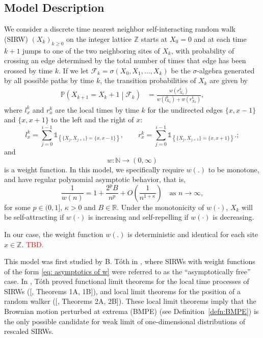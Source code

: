 \documentclass[twoside,12pt,a4paper]{article}
\numberwithin{equation}{section}
\newcommand\TBD{\textcolor{red}{TBD.}}
\begin{document}
	\subsection{Model Description} 
	We consider a discrete time nearest neighbor self-interacting random walk (SIRW) $(X_k)_{k\geq 0}$ on the integer lattice $\mathbb{Z}$ starts at $X_0 = 0$ and at each time $k+1$ jumps to one of the two neighboring sites of $X_k$, with probability of crossing an edge determined by the total number of times that edge has been crossed by time $k$. 
	If we let $\mathcal{F}_k = \sigma\left( X_0,X_1,\dots,X_k \right) $ be the $\sigma$-algebra generated by all possible paths by time $k$, the transition probabilities of $X_k$ are given by
	\begin{align}\label{dynamic}
		\mathbb{P}\left( X_{k+1} =  X_k+1 \middle| \mathcal{F}_k   \right) 
		&=  \frac{  w(r_{X_k}^k)}{ w(l_{X_k}^k)  + w(r_{X_k}^k)   }
	,\end{align}
	where $l_x^k$ and $r_x^k$ are the local times by time $k$ for the undirected edges $\{x,x-1\}$ and $\{x,x+1\}$ to the left and the right of $x$:
	\[ 
	l_x^k = \sum_{j=0}^{i-1} \mathbb{1}_{ \left\{  \{X_j, X_{j+1}\} =  \{x,x-1\} \right\} }, \qquad
	r_x^k = \sum_{j=0}^{i-1} \mathbb{1}_{ \left\{  \{X_j, X_{j+1}\} =  \{x,x+1\} \right\} }.   
;\]
	and
	\[
		w: \mathbb{N} \to  (0, \infty )
	\] 
	is a weight function.
	In this model, we specifically require $w(.)$ to be monotone, and have regular polynomial asymptotic behavior, that is,
	\begin{equation}\label{eq: asymptotics of w}
		\frac{1}{w(n)} = 1 + \frac{2^p B}{n^p} + O\left(\frac{1}{n^{1+\mathcal{\kappa}}}\right) \quad \mbox{as $n\to \infty$}, 	
	\end{equation} 
	for some $p \in (0,1]$, $\kappa>0$ and $B\in \mathbb{R}$. Under the monotonicity of $w(\cdot )$, $X_k$ will be self-attracting if $w(\cdot )$ is increasing and self-repelling if $w(\cdot )$ is decreasing.

	In our case, the weight function $w(.)$ is deterministic and identical for each site $x\in \mathbb{Z}$. \TBD 

	This model was first studied by B. T\'oth in \cite{T96}, where SIRWs with weight functions of the form \eqref{eq: asymptotics of w} were referred to as the ``asymptotically free'' case. In \cite{T96}, T\'oth proved functional limit theorems for the local time processes of SIRWs ([\cite{T96}, Theorems 1A, 1B]), and local limit theorems for the position of a random walker ([\cite{T96}, Theorems 2A, 2B]). These local limit theorems imply that the Brownian motion perturbed at extrema (BMPE) (see Definition~\ref{defn:BMPE}) is the only possible candidate for weak limit of one-dimensional distributions of rescaled SIRWs. 
	
\end{document}
